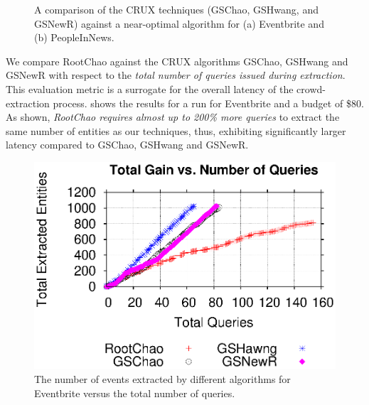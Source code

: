 \begin{figure}
\begin{center}
\end{center}
\caption{A comparison of the CRUX techniques (GSChao, GSHwang, and GSNewR) against a near-optimal algorithm for (a) Eventbrite and (b) PeopleInNews.}
\label{fig:resultsextr}
\vspace{-10pt}
\end{figure}

We compare RootChao against the CRUX algorithms GSChao, GSHwang and GSNewR with respect to the {\em total number of queries issued during extraction}. This evaluation metric is a surrogate for the overall latency of the crowd-extraction process.  shows the results for a run for Eventbrite and a budget of \$80. As shown, {\em RootChao requires almost up to 200\% more queries} to extract the same number of entities as our techniques, thus, exhibiting significantly larger latency compared to GSChao, GSHwang and GSNewR.

\begin{figure}
	\begin{center}
	\includegraphics[clip,scale=0.5]{figs/gain_rounds.eps}
	\caption{The number of events extracted by different algorithms for Eventbrite versus the total number of queries.}
	\label{fig:rounds}
	\end{center}
\end{figure}

